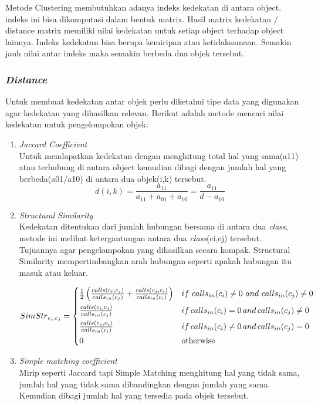 Metode Clustering membutuhkan adanya indeks kedekatan di antara object. indeks ini bisa dikomputasi dalam bentuk matrix. Hasil matrix kedekatan / distance matrix memiliki nilai kedekatan untuk setiap object terhadap object lainnya. Indeks kedekatan bisa berupa kemiripan atau ketidaksamaan. Semakin jauh nilai antar indeks maka semakin berbeda dua objek tersebut\cite{2C9}.

\subsubsection{\textit{Distance}}
Untuk membuat kedekatan antar objek perlu diketahui tipe data yang digunakan agar kedekatan yang dihasilkan relevan.  Berikut adalah metode mencari nilai kedekatan untuk pengelompokan objek:
\begin{enumerate}[leftmargin=1.3cm]
	\item \textit{Jaccard Coefficient} \cite{2C9} \\
	Untuk mendapatkan kedekatan dengan menghitung total hal yang sama(a{\tiny11}) atau terhubung di antara object kemudian dibagi dengan jumlah hal yang berbeda(a{\tiny01}/a{\tiny10}) di antara dua objek(i,k) tersebut. 
	\begin{equation}
		d(i,k)={\frac{a_{11}}{a_{11}+a_{01}+a_{10}}}={\frac{a_{11}}{d-a_{10}}}
	\end{equation}
	\item \textit{Structural Similarity} \cite{ECD}  \\
	Kedekatan ditentukan dari jumlah hubungan bersama di antara dua \textit{class}, metode ini melihat ketergantungan antara dua \textit{class}(ci,cj) tersebut. Tujuannya agar pengelompokan yang dihasilkan secara kompak. Structural Similarity mempertimbangkan arah hubungan seperti apakah hubungan itu masuk atau keluar.

	\begin{equation}
		Sim{Str}_{c_{i},c_{j}} = \begin{cases*}
			\frac{1}{2}\left(\frac{c a l l s(c_{i},c_{j})}{c a l l s_{i n}(c_{j})}+\frac{c a l l s(c_{j},c_{i})}{c a l l s_{i n}(c_{i})}\right)  & $i f\,\,c a l l s_{i n}(c_{i})\neq0\,\, a n d\,\,c a l l s_{i n}(c_{j})\neq0$\\
			\frac{c alls(c_{i,}c_{j})}{c a l l s_{i n}(c_{j})}              
			& $i f\,c a l l s_{i n}(c_{i})=0\, a n d\,c a l l s_{i n}(c_{j})\neq0$ \\
			\frac{c a l l s(c_{j},c_{i})}{c a l l s_{i n}(c_{i})}              & $i f\,c a l l s_{i n}(c_{i})\neq0\, a n d\,c a l l s_{i n}(c_{j})=0$\\
		  0                    & otherwise
		\end{cases*}
	\end{equation}
	\item \textit{Simple matching coefficient} \cite{2C9} \\
	Mirip seperti Jaccard tapi Simple Matching menghitung hal yang tidak sama, jumlah hal yang tidak sama dibandingkan  dengan jumlah yang sama. Kemudian dibagi jumlah hal yang tersedia pada objek tersebut.	
\end{enumerate}	

